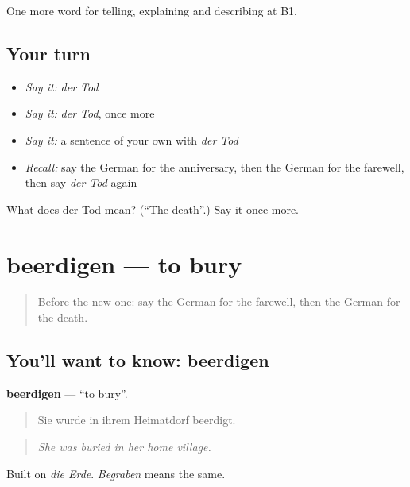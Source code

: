 \begin{grammarlens}[title={What you've built}]
One more word for telling, explaining and describing at B1.
\end{grammarlens}

\subsection*{Your turn}
\begin{itemize}
\raggedright
  \item \emph{Say it:} \emph{der Tod}
  \item \emph{Say it:} \emph{der Tod}, once more
  \item \emph{Say it:} a sentence of your own with \emph{der Tod}
  \item \emph{Recall:} say the German for the anniversary, then the German for the farewell, then say \emph{der Tod} again
\end{itemize}

\begin{tcolorbox}[breakable,colback=teal!4,colframe=teal!35!black,title={Before you move on}]
What does der Tod mean? (\textquotedblleft{}The death\textquotedblright{}.) Say it once more.
\end{tcolorbox}
\section[beerdigen]{beerdigen — to bury}

\label{lesson:GE-C303-beerdigen}



\begin{quote}
Before the new one: say the German for the farewell, then the German for the death.
\end{quote}

\subsection*{You'll want to know: beerdigen}
\textbf{beerdigen} — \textquotedblleft{}to bury\textquotedblright{}.

\begin{quote}
Sie wurde in ihrem Heimatdorf beerdigt.
\end{quote}

\begin{quote}
\emph{She was buried in her home village.}
\end{quote}

Built on \emph{die Erde}. \emph{Begraben} means the same.

